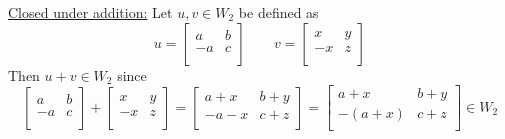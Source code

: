 \documentclass[12pt]{article}
\begin{document}
\begin{enumerate}
\begin{enumerate}
\begin{mybox}
            \noindent \underline{Closed under addition:} Let $u, v \in W_2$ be defined as
            $$u = \left[
              \begin{array}{cc}
                a & b \\
                -a & c \\
              \end{array}
            \right] \qquad v = \left[
              \begin{array}{cc}
                x & y \\
                -x & z \\
              \end{array}
            \right]$$
            Then $u + v \in W_2$ since
            $$\left[
              \begin{array}{cc}
                a & b \\
                -a & c \\
              \end{array}
            \right] + \left[
              \begin{array}{cc}
                x & y \\
                -x & z \\
              \end{array}
            \right] = 
            \left[
              \begin{array}{cc}
                a + x & b + y \\
                - a - x & c + z \\
              \end{array}
            \right] = 
            \left[
              \begin{array}{cc}
                a + x & b + y \\
                -(a + x) & c + z \\
              \end{array}
            \right] \in W_2
            $$
            \vspace{0.2in}
            

\end{mybox}
\end{enumerate}
\end{enumerate}
\end{document}
